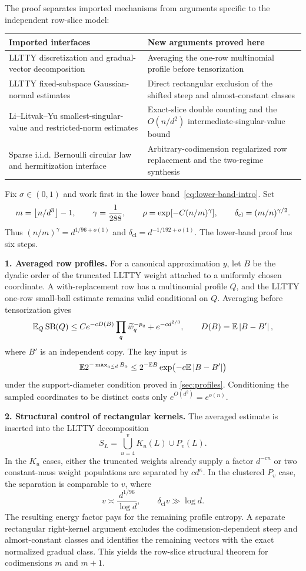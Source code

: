 The proof separates imported mechanisms from arguments specific to the independent row-slice model:
\begin{center}
\begin{tabular}{p{}p{}}
\toprule
Imported interfaces & New arguments proved here\\
\midrule
LLTTY discretization and gradual-vector decomposition & Averaging the one-row multinomial profile before tensorization\\
LLTTY fixed-subspace Gaussian-normal estimates & Direct rectangular exclusion of the shifted steep and almost-constant classes\\
Li--Litvak--Yu smallest-singular-value and restricted-norm estimates & Exact-slice double counting and the $O(n/d^2)$ intermediate-singular-value bound\\
Sparse i.i.d. Bernoulli circular law and hermitization interface & Arbitrary-codimension regularized row replacement and the two-regime synthesis\\
\bottomrule
\end{tabular}
\end{center}

Fix $\sigma\in(0,1)$ and work first in the lower band~\eqref{eq:lower-band-intro}. Set
\[
  m=\left\lfloor n/d^3\right\rfloor-1,
  \qquad
  \gamma=\frac1{288},
  \qquad
  \rho=\exp[-C(n/m)^\gamma],
  \qquad
  \delta_{\mathrm{cl}}=(m/n)^{\gamma/2}.
\]
Thus $(n/m)^\gamma=d^{1/96+o(1)}$ and $\delta_{\mathrm{cl}}=d^{-1/192+o(1)}$. The lower-band proof has six steps.

\smallskip
\noindent\textbf{1. Averaged row profiles.}
For a canonical approximation $y$, let $B$ be the dyadic order of the truncated LLTTY weight attached to a uniformly chosen coordinate. A with-replacement row has a multinomial profile $Q$, and the LLTTY one-row small-ball estimate remains valid conditional on $Q$. Averaging before tensorization gives
\[
  \mathbb E_Q\operatorname{SB}(Q)
  \le Ce^{-cD(B)}\prod_q\widetilde w_q^{-p_q}+e^{-cd^{2/3}},
  \qquad
  D(B)=\mathbb E\left|B-B'\right|,
\]
where $B'$ is an independent copy. The key input is
\[
  \mathbb E 2^{-\max_{a\le d}B_a}
  \le 2^{-\mathbb E B}\exp\bigl(-c\mathbb E\left|B-B'\right|\bigr)
\]
under the support-diameter condition proved in \cref{sec:profiles}. Conditioning the sampled coordinates to be distinct costs only $e^{O(d^2)}=e^{o(n)}$.

\smallskip
\noindent\textbf{2. Structural control of rectangular kernels.}
The averaged estimate is inserted into the LLTTY decomposition
\[
  S_L=\bigcup_{u=4}^{v}K_u(L)\cup P_v(L).
\]
In the $K_u$ cases, either the truncated weights already supply a factor $d^{-cn}$ or two constant-mass weight populations are separated by $cd^\kappa$. In the clustered $P_v$ case, the separation is comparable to $v$, where
\[
  v\asymp \frac{d^{1/96}}{\log d},
  \qquad
  \delta_{\mathrm{cl}}v\gg\log d.
\]
The resulting energy factor pays for the remaining profile entropy. A separate rectangular right-kernel argument excludes the codimension-dependent steep and almost-constant classes and identifies the remaining vectors with the exact normalized gradual class. This yields the row-slice structural theorem for codimensions $m$ and $m+1$.

